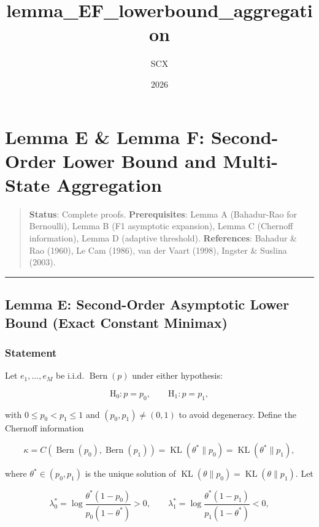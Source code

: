 \documentclass[12pt]{article}
\title{lemma\_EF\_lowerbound\_aggregation}
\author{SCX}
\date{2026}
\begin{document}
\maketitle
\section{Lemma E \& Lemma F: Second-Order Lower Bound and Multi-State
Aggregation}\label{lemma-e-lemma-f-second-order-lower-bound-and-multi-state-aggregation}

\begin{quote}
\textbf{Status}: Complete proofs. \textbf{Prerequisites}: Lemma A
(Bahadur-Rao for Bernoulli), Lemma B (F1 asymptotic expansion), Lemma C
(Chernoff information), Lemma D (adaptive threshold).
\textbf{References}: Bahadur \& Rao (1960), Le Cam (1986), van der Vaart
(1998), Ingster \& Suslina (2003).
\end{quote}

\begin{center}\rule{0.5\linewidth}{0.5pt}\end{center}

\subsection{Lemma E: Second-Order Asymptotic Lower Bound (Exact Constant
Minimax)}\label{lemma-e-second-order-asymptotic-lower-bound-exact-constant-minimax}

\subsubsection{Statement}\label{statement}

Let \(e_1,\dots,e_M\) be i.i.d. \(\operatorname{Bern}(p)\) under either
hypothesis:

\[
\mathrm{H}_0 : p = p_0,\qquad \mathrm{H}_1 : p = p_1,
\]

with \(0 \le p_0 < p_1 \le 1\) and \((p_0,p_1) \neq (0,1)\) to avoid
degeneracy. Define the Chernoff information

\[
\kappa = C(\operatorname{Bern}(p_0),\operatorname{Bern}(p_1)) = \operatorname{KL}(\theta^*\|p_0) = \operatorname{KL}(\theta^*\|p_1),
\]

where \(\theta^* \in (p_0,p_1)\) is the unique solution of
\(\operatorname{KL}(\theta\|p_0) = \operatorname{KL}(\theta\|p_1)\). Let

\[
\lambda_0^* = \log\frac{\theta^*(1-p_0)}{p_0(1-\theta^*)} > 0,\qquad
\lambda_1^* = \log\frac{\theta^*(1-p_1)}{p_1(1-\theta^*)} < 0,
\]
\end{document}
